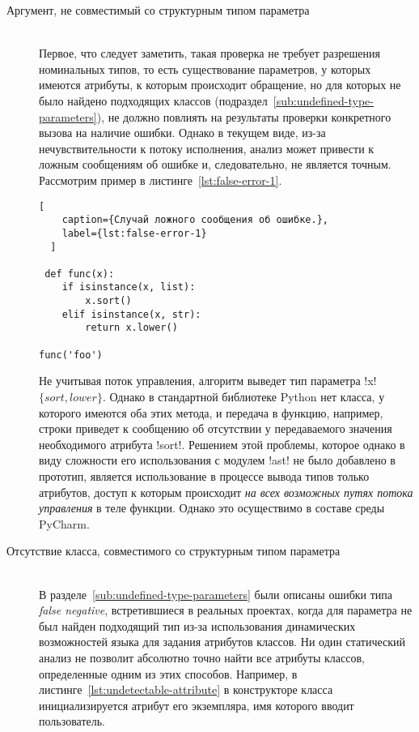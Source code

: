 \begin{description} 

\item[Аргумент, не совместимый со структурным типом параметра] \hfill \\ 
  Первое, что следует заметить, такая проверка не требует разрешения
  номинальных типов, то есть существование параметров, у которых имеются
  атрибуты, к которым происходит обращение, но для которых не было найдено
  подходящих классов (подраздел~\ref{sub:undefined-type-parameters}), не должно повлиять на результаты
  проверки конкретного вызова на наличие ошибки. Однако в текущем виде, из-за
  нечувствительности к потоку исполнения, анализ может привести к ложным
  сообщениям об ошибке и, следовательно, не является точным. Рассмотрим пример в
  листинге~\ref{lst:false-error-1}. 

  \begin{lstlisting}[
    caption={Случай ложного сообщения об ошибке.},
    label={lst:false-error-1}
  ]

 def func(x):
    if isinstance(x, list):
        x.sort()
    elif isinstance(x, str):
        return x.lower()

func('foo')     
  \end{lstlisting}
    
  Не учитывая поток управления, алгоритм выведет тип параметра !x! $\{ sort,
  lower \}$. Однако в стандартной библиотеке Python нет класса, у которого
  имеются оба этих метода, и передача в функцию, например, строки приведет к сообщению об
  отсутствии у передаваемого значения необходимого атрибута !sort!. Решением
  этой проблемы, которое однако в виду сложности его использования с модулем
  !ast! не было добавлено в прототип, является использование в процессе вывода
  типов только атрибутов, доступ к которым происходит \emph{на всех возможных путях
  потока управления} в теле функции. Однако это осуществимо в составе среды
  PyCharm.

\item[Отсутствие класса, совместимого со структурным типом параметра] \hfill \\
  В разделе~\ref{sub:undefined-type-parameters} были описаны ошибки типа
  \emph{false negative}, встретившиеся в реальных проектах, когда для параметра
  не был найден подходящий тип из-за использования динамических возможностей
  языка для задания атрибутов классов. Ни один
  статический анализ не позволит абсолютно точно найти все атрибуты классов,
  определенные одним из этих способов. Например, в
  листинге~\ref{lst:undetectable-attribute} в конструкторе класса инициализируется
  атрибут его экземпляра, имя которого вводит пользователь.


\end{description}
